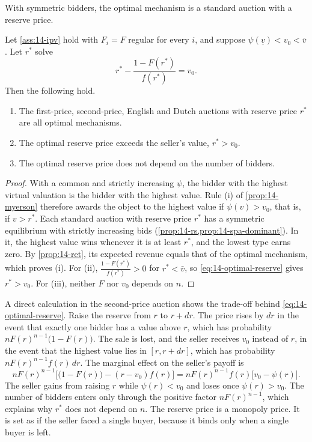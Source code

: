 With symmetric bidders, the optimal mechanism is a standard auction with a reserve price.

\begin{corollary}\label{cor:14-optimal-reserve}
Let \cref{ass:14-ipv} hold with $F_i=F$ regular for every $i$, and suppose $\psi(\underline v)<v_0<\bar v$. Let $r^*$ solve
\begin{equation}\label{eq:14-optimal-reserve}
r^*-\frac{1-F(r^*)}{f(r^*)}=v_0.
\end{equation}
Then the following hold.
\begin{enumerate}[label=(\roman*)]
\item The first-price, second-price, English and Dutch auctions with reserve price $r^*$ are all optimal mechanisms.
\item The optimal reserve price exceeds the seller's value, $r^*>v_0$.
\item The optimal reserve price does not depend on the number of bidders.
\end{enumerate}
\end{corollary}

\begin{proof}
With a common and strictly increasing $\psi$, the bidder with the highest virtual valuation is the bidder with the highest value. Rule (i) of \cref{prop:14-myerson} therefore awards the object to the highest value if $\psi(v)>v_0$, that is, if $v>r^*$. Each standard auction with reserve price $r^*$ has a symmetric equilibrium with strictly increasing bids (\cref{prop:14-rs,prop:14-spa-dominant}). In it, the highest value wins whenever it is at least $r^*$, and the lowest type earns zero. By \cref{prop:14-ret}, its expected revenue equals that of the optimal mechanism, which proves (i). For (ii), $\frac{1-F(r^*)}{f(r^*)}>0$ for $r^*<\bar v$, so \eqref{eq:14-optimal-reserve} gives $r^*>v_0$. For (iii), neither $F$ nor $v_0$ depends on $n$.
\end{proof}

A direct calculation in the second-price auction shows the trade-off behind \eqref{eq:14-optimal-reserve}. Raise the reserve from $r$ to $r+dr$. The price rises by $dr$ in the event that exactly one bidder has a value above $r$, which has probability $nF(r)^{n-1}\big(1-F(r)\big)$. The sale is lost, and the seller receives $v_0$ instead of $r$, in the event that the highest value lies in $[r,r+dr]$, which has probability $nF(r)^{n-1}f(r)\,dr$. The marginal effect on the seller's payoff is
\[
nF(r)^{n-1}\Big[\big(1-F(r)\big)-(r-v_0)f(r)\Big]=nF(r)^{n-1}f(r)\big[v_0-\psi(r)\big].
\]
The seller gains from raising $r$ while $\psi(r)<v_0$ and loses once $\psi(r)>v_0$. The number of bidders enters only through the positive factor $nF(r)^{n-1}$, which explains why $r^*$ does not depend on $n$. The reserve price is a monopoly price. It is set as if the seller faced a single buyer, because it binds only when a single buyer is left.

